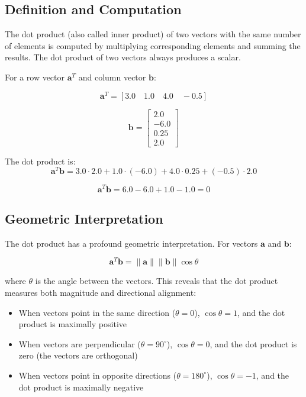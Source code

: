 \documentclass{book}
\begin{document}
\subsection{Definition and Computation}

The dot product (also called inner product) of two vectors with the same number of elements is computed by multiplying corresponding elements and summing the results. The dot product of two vectors always produces a scalar.

For a row vector $\mathbf{a}^T$ and column vector $\mathbf{b}$:

\begin{equation}
\mathbf{a}^T = [3.0 \quad 1.0 \quad 4.0 \quad -0.5]
\end{equation}

\begin{equation}
\mathbf{b} = \begin{bmatrix}
2.0 \\
-6.0 \\
0.25 \\
2.0
\end{bmatrix}
\end{equation}

The dot product is:
\begin{equation}
\mathbf{a}^T \mathbf{b} = 3.0 \cdot 2.0 + 1.0 \cdot (-6.0) + 4.0 \cdot 0.25 + (-0.5) \cdot 2.0
\end{equation}

\begin{equation}
\mathbf{a}^T \mathbf{b} = 6.0 - 6.0 + 1.0 - 1.0 = 0
\end{equation}

\subsection{Geometric Interpretation}

The dot product has a profound geometric interpretation. For vectors $\mathbf{a}$ and $\mathbf{b}$:

\begin{equation}
\mathbf{a}^T \mathbf{b} = \|\mathbf{a}\| \|\mathbf{b}\| \cos \theta
\end{equation}

where $\theta$ is the angle between the vectors. This reveals that the dot product measures both magnitude and directional alignment:

\begin{itemize}
\item When vectors point in the same direction ($\theta = 0$), $\cos \theta = 1$, and the dot product is maximally positive
\item When vectors are perpendicular ($\theta = 90^\circ$), $\cos \theta = 0$, and the dot product is zero (the vectors are orthogonal)
\item When vectors point in opposite directions ($\theta = 180^\circ$), $\cos \theta = -1$, and the dot product is maximally negative
\end{itemize}
\end{document}
